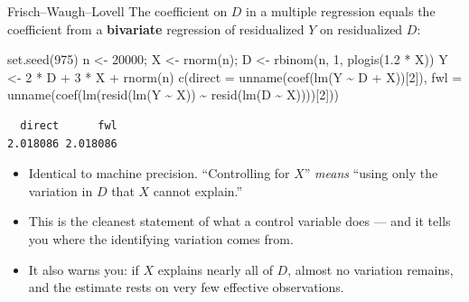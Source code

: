 \documentclass[
  11pt,
  ignorenonframetext,
  aspectratio=169,
]{beamer}
\newenvironment{Shaded}{\begin{snugshade}}{\end{snugshade}}
\newcommand{\AttributeTok}[1]{\textcolor[rgb]{0.40,0.45,0.13}{#1}}
\newcommand{\DecValTok}[1]{\textcolor[rgb]{0.68,0.00,0.00}{#1}}
\newcommand{\FloatTok}[1]{\textcolor[rgb]{0.68,0.00,0.00}{#1}}
\newcommand{\FunctionTok}[1]{\textcolor[rgb]{0.28,0.35,0.67}{#1}}
\newcommand{\NormalTok}[1]{\textcolor[rgb]{0.00,0.23,0.31}{#1}}
\newcommand{\OtherTok}[1]{\textcolor[rgb]{0.00,0.23,0.31}{#1}}
\newcommand{\SpecialCharTok}[1]{\textcolor[rgb]{0.37,0.37,0.37}{#1}}
\providecommand{\tightlist}{%
  \setlength{\itemsep}{0pt}\setlength{\parskip}{0pt}}
\begin{document}
\begin{frame}[fragile]{Frisch--Waugh--Lovell}
\protect{}\label{frischwaughlovell}
The coefficient on \(D\) in a multiple regression equals the coefficient
from a \textbf{bivariate} regression of residualized \(Y\) on
residualized \(D\):

\begin{Shaded}
\begin{Highlighting}[]
\FunctionTok{set.seed}\NormalTok{(}\DecValTok{975}\NormalTok{)}
\NormalTok{n }\OtherTok{\textless{}{-}} \DecValTok{20000}\NormalTok{; X }\OtherTok{\textless{}{-}} \FunctionTok{rnorm}\NormalTok{(n); D }\OtherTok{\textless{}{-}} \FunctionTok{rbinom}\NormalTok{(n, }\DecValTok{1}\NormalTok{, }\FunctionTok{plogis}\NormalTok{(}\FloatTok{1.2} \SpecialCharTok{*}\NormalTok{ X))}
\NormalTok{Y }\OtherTok{\textless{}{-}} \DecValTok{2} \SpecialCharTok{*}\NormalTok{ D }\SpecialCharTok{+} \DecValTok{3} \SpecialCharTok{*}\NormalTok{ X }\SpecialCharTok{+} \FunctionTok{rnorm}\NormalTok{(n)}
\FunctionTok{c}\NormalTok{(}\AttributeTok{direct =} \FunctionTok{unname}\NormalTok{(}\FunctionTok{coef}\NormalTok{(}\FunctionTok{lm}\NormalTok{(Y }\SpecialCharTok{\textasciitilde{}}\NormalTok{ D }\SpecialCharTok{+}\NormalTok{ X))[}\DecValTok{2}\NormalTok{]),}
  \AttributeTok{fwl    =} \FunctionTok{unname}\NormalTok{(}\FunctionTok{coef}\NormalTok{(}\FunctionTok{lm}\NormalTok{(}\FunctionTok{resid}\NormalTok{(}\FunctionTok{lm}\NormalTok{(Y }\SpecialCharTok{\textasciitilde{}}\NormalTok{ X)) }\SpecialCharTok{\textasciitilde{}} \FunctionTok{resid}\NormalTok{(}\FunctionTok{lm}\NormalTok{(D }\SpecialCharTok{\textasciitilde{}}\NormalTok{ X))))[}\DecValTok{2}\NormalTok{]))}
\end{Highlighting}
\end{Shaded}

\begin{verbatim}
  direct      fwl 
2.018086 2.018086 
\end{verbatim}

\vspace{0.2em}

\begin{itemize}
\tightlist
\item
  Identical to machine precision. ``Controlling for \(X\)'' \emph{means}
  ``using only the variation in \(D\) that \(X\) cannot explain.''
\item
  This is the cleanest statement of what a control variable does --- and
  it tells you where the identifying variation comes from.
\item
  It also warns you: if \(X\) explains nearly all of \(D\), almost no
  variation remains, and the estimate rests on very few effective
  observations.
\end{itemize}
\end{frame}
\end{document}
